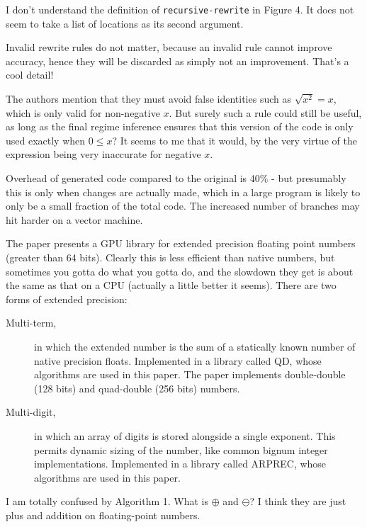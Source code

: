 \documentclass[a4paper, oneside, final]{memoir}
\begin{document}
I don't understand the definition of \texttt{recursive-rewrite} in
Figure 4.  It does not seem to take a list of locations as its second
argument.

Invalid rewrite rules do not matter, because an invalid rule cannot
improve accuracy, hence they will be discarded as simply not an
improvement.  That's a cool detail!

The authors mention that they must avoid false identities such as
$\sqrt{x^{2}} = x$, which is only valid for non-negative $x$.  But
surely such a rule could still be useful, as long as the final regime
inference ensures that this version of the code is only used exactly
when $0\leq x$?  It seems to me that it would, by the very virtue of
the expression being very inaccurate for negative $x$.

Overhead of generated code compared to the original is 40\% - but
presumably this is only when changes are actually made, which in a
large program is likely to only be a small fraction of the total code.
The increased number of branches may hit harder on a vector machine.

\begin{quote}
\end{quote}

The paper presents a GPU library for extended precision floating point
numbers (greater than 64 bits).  Clearly this is less efficient than
native numbers, but sometimes you gotta do what you gotta do, and the
slowdown they get is about the same as that on a CPU (actually a
little better it seems).  There are two forms of extended precision:

\begin{description}
\item[Multi-term,] in which the extended number is the sum of a
  statically known number of native precision floats.  Implemented in
  a library called QD, whose algorithms are used in this paper.  The
  paper implements double-double (128 bits) and quad-double (256 bits)
  numbers.
\item[Multi-digit,] in which an array of digits is stored alongside a
  single exponent.  This permits dynamic sizing of the number, like
  common bignum integer implementations.  Implemented in a library
  called ARPREC, whose algorithms are used in this paper.
\end{description}

I am totally confused by Algorithm 1.  What is $\oplus$ and $\ominus$?
I think they are just plus and addition on floating-point numbers.
\end{document}
